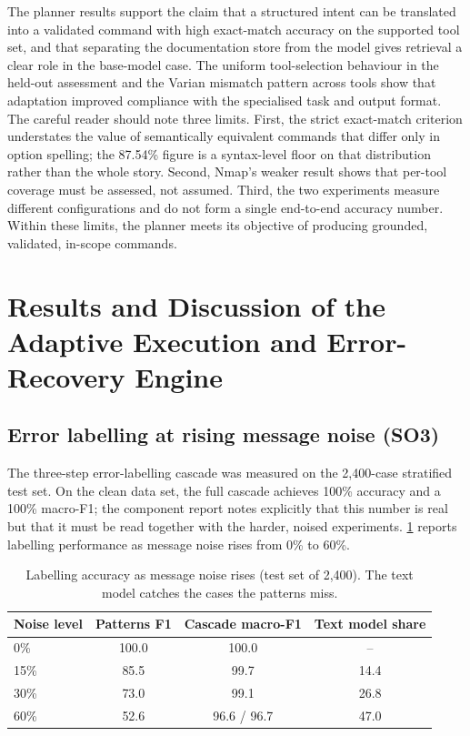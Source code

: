 The planner results support the claim that a structured intent can be
translated into a validated command with high exact-match accuracy on the
supported tool set, and that separating the documentation store from the model
gives retrieval a clear role in the base-model case. The uniform tool-selection
behaviour in the held-out assessment and the Varian mismatch pattern across
tools show that adaptation improved compliance with the specialised task and
output format. The careful reader should note three limits. First, the strict
exact-match criterion understates the value of semantically equivalent commands
that differ only in option spelling; the 87.54\% figure is a syntax-level floor
on that distribution rather than the whole story. Second, Nmap's weaker result
shows that per-tool coverage must be assessed, not assumed. Third, the two
experiments measure different configurations and do not form a single
end-to-end accuracy number. Within these limits, the planner meets its
objective of producing grounded, validated, in-scope commands.

\section{Results and Discussion of the Adaptive Execution and Error-Recovery Engine}\label{sec:results-aeere}

\subsection{Error labelling at rising message noise (SO3)}\label{sec:results-aeere-labelling}

The three-step error-labelling cascade was measured on the 2,400-case stratified
test set. On the clean data set, the full cascade achieves 100\% accuracy and a
100\% macro-F1; the component report notes explicitly that this number is real
but that it must be read together with the harder, noised experiments. \cref{tab:aeere-noise} reports labelling performance as message noise rises from 0\% to
60\%.

\begin{table}[htbp]
  \centering
  \begin{tabular}{@{}lccc@{}}
    \toprule
    \textbf{Noise level} & \textbf{Patterns F1} & \textbf{Cascade macro-F1} & \textbf{Text model share}\\
    \midrule
    0\% & 100.0 & 100.0 & --\\
    15\% & 85.5 & 99.7 & 14.4\\
    30\% & 73.0 & 99.1 & 26.8\\
    60\% & 52.6 & 96.6 / 96.7 & 47.0\\
    \bottomrule
  \end{tabular}
  \caption{Labelling accuracy as message noise rises (test set of 2,400). The
  text model catches the cases the patterns miss.}\label{tab:aeere-noise}
\end{table}

